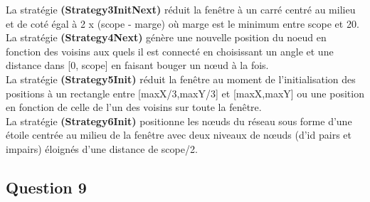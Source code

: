 \documentclass[10pt]{report}
\begin{document}
La stratégie \textbf{(Strategy3InitNext)} réduit la fenêtre à un carré centré au milieu et de coté égal à 2 x (scope - marge) où marge est le minimum entre scope et 20.\\

La stratégie \textbf{(Strategy4Next)} génère une nouvelle position du noeud en fonction des voisins aux quels il est connecté en choisissant un angle et une distance dans [0, scope] en faisant bouger un nœud à la fois.\\

La stratégie \textbf{(Strategy5Init)} réduit la fenêtre au moment de l'initialisation des positions à un rectangle entre [maxX/3,maxY/3] et [maxX,maxY] ou une position en fonction de celle de l'un des voisins sur toute la fenêtre.\\

La stratégie \textbf{(Strategy6Init)} positionne les nœuds du réseau sous forme d'une étoile centrée au milieu de la fenêtre avec deux niveaux de nœuds (d'id pairs et impairs) éloignés d'une distance de scope/2.\\

\newpage
\subsection{Question 9}
\end{document}
